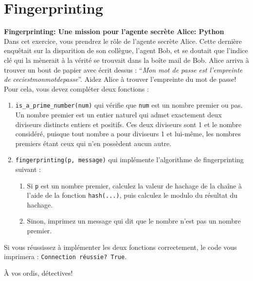 \section{Fingerprinting}
\begin{Exercice}[20 minutes]\textbf{Fingerprinting: Une mission pour l'agente secrète Alice: Python}\\
    Dans cet exercice, vous prendrez le rôle de l'agente secrète Alice. Cette dernière enquêtait sur la disparition de son collègue,
    l'agent Bob, et se doutait que l'indice clé qui la mènerait à la vérité se trouvait dans la boîte mail de Bob. Alice arriva à trouver
    un bout de papier avec écrit dessus : ``\textit{Mon mot de passe est l'empreinte de ceciestmonmotdepasse}''. Aidez Alice à trouver l'empreinte du mot de passe! \\

    Pour cela, vous devez compléter deux fonctions :
    \begin{enumerate}
        \item \lstinline{is_a_prime_number(num)} qui vérifie que \lstinline{num} est un nombre premier ou pas. Un nombre premier est un entier naturel 
        qui admet exactement deux diviseurs distincts entiers et positifs. Ces deux diviseurs sont 1 et le nombre considéré, 
        puisque tout nombre a pour diviseurs 1 et lui-même, les nombres premiers étant ceux qui n’en possèdent aucun autre.
        
        \item \lstinline{fingerprinting(p, message)} qui implémente l'algorithme de fingerprinting suivant :
              \begin{enumerate}
                  \item Si \lstinline{p} est un nombre premier, calculez la valeur de hachage de la chaîne à l'aide de la fonction \lstinline{hash(...)}, puis calculez le modulo du résultat du hachage.
                  \item Sinon, imprimez un message qui dit que le nombre n'est pas un nombre premier.    
              \end{enumerate}
    \end{enumerate}

    Si vous réussissez à implémenter les deux fonctions correctement, le code vous imprimera : \lstinline{Connection réussie? True}.

    À vos ordis, détectives!

    

    \begin{solution}
        
    \end{solution}
\end{Exercice}
\newpage
